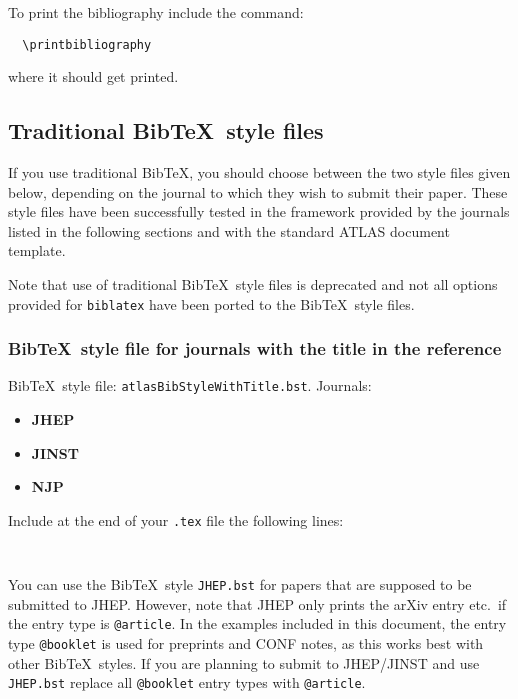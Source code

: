 \documentclass[UKenglish, texlive=2016]{\ATLASLATEXPATH atlasdoc}
\newcommand*{\BibTeX}{Bib\TeX}
\newcommand{\File}[1]{\texttt{#1}\xspace}
\newcommand{\Package}[1]{\texttt{#1}\xspace}
\begin{document}
To print the bibliography include the command:
%
\begin{verbatim}
  \printbibliography
\end{verbatim}
%
where it should get printed.


\subsection{Traditional \BibTeX\ style files}

If you use traditional \BibTeX, you should choose between the two style files given below,
depending on the journal to which they wish to submit their paper.
These style files have been successfully tested in the framework provided by
the journals listed in the following sections and with the standard ATLAS document template.

Note that use of traditional \BibTeX\ style files is deprecated
and not all options provided for \Package{biblatex} have been ported to the \BibTeX\ style files.


\subsubsection{\BibTeX\ style file for journals with the title in the reference}

\BibTeX\ style file: \Package{atlasBibStyleWithTitle.bst}.
Journals:
\begin{itemize}\setlength{\parskip}{0pt}\setlength{\itemsep}{0pt}
\item \textbf{JHEP}
\item \textbf{JINST}
\item \textbf{NJP}
\end{itemize}
\noindent Include at the end of your \File{.tex} file the following lines:
\begin{verbatim}


\end{verbatim}

You can use the \BibTeX\ style \File{JHEP.bst} for papers that are supposed to be submitted to JHEP.
However, note that JHEP only prints the arXiv entry etc.\ if the entry type is \texttt{@article}.
In the examples included in this document,
the entry type \texttt{@booklet} is used for preprints and CONF notes,
as this works best with other \BibTeX\ styles.
If you are planning to submit to JHEP/JINST and use \File{JHEP.bst}
replace all \texttt{@booklet} entry types with \texttt{@article}.
\end{document}

